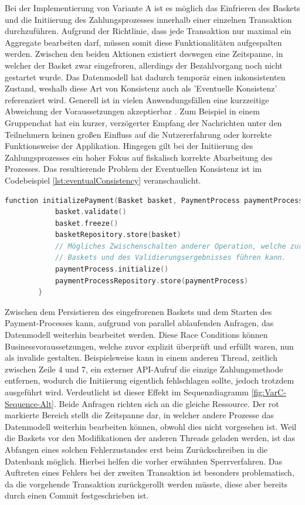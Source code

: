 Bei der Implementierung von Variante A ist es möglich das Einfrieren des Baskets und die Initiierung des Zahlungsprozesses innerhalb einer einzelnen Transaktion durchzuführen. Aufgrund der Richtlinie, dass jede Transaktion nur maximal ein Aggregate bearbeiten darf, müssen somit diese Funktionalitäten aufgespalten werden. Zwischen den beiden Aktionen existiert deswegen eine Zeitspanne, in welcher der Basket zwar eingefroren, allerdings der Bezahlvorgang noch nicht gestartet wurde. Das Datenmodell hat dadurch temporär einen inkonsistenten Zustand, weshalb diese Art von Konsistenz auch als 'Eventuelle Konsistenz' referenziert wird. Generell ist in vielen Anwendungsfällen eine kurzzeitige Abweichung der Voraussetzungen akzeptierbar \cite[S. 364f.]{Vernon.2011}. Zum Beispiel in einem Gruppenchat hat ein kurzer, verzögerter Empfang der Nachrichten unter den Teilnehmern keinen großen Einfluss auf die Nutzererfahrung oder korrekte Funktionsweise der Applikation. Hingegen gilt bei der Initiierung des Zahlungsprozesses ein hoher Fokus auf fiskalisch korrekte Abarbeitung des Prozesses. Das resultierende Problem der Eventuellen Konsistenz ist im Codebeispiel \ref{lst:eventualConsistency} veranschaulicht.

\begin{minipage}{\linewidth} %
	\begin{lstlisting}[caption={Getrennte Transaktionen für die Initiierung des Bezahlvorgangs}, label={lst:eventualConsistency}, language=Kotlin]
		function initializePayment(Basket basket, PaymentProcess paymentProcess) {
			basket.validate()
			basket.freeze()
			basketRepository.store(basket)
			// Mögliches Zwischenschalten anderer Operation, welche zur Abänderung des
			// Baskets und des Validierungsergebnisses führen kann.
			paymentProcess.initialize()
			paymentProcessRepository.store(paymentProcess)
		}
	\end{lstlisting}
\end{minipage}

Zwischen dem Persistieren des eingefrorenen Baskets und dem Starten des Payment-Processes kann, aufgrund von parallel ablaufenden Anfragen, das Datenmodell weiterhin bearbeitet werden. Diese \Gls{Race Condition}s können Businessvoraussetzungen, welche zuvor explizit überprüft und erfüllt waren, nun als invalide gestalten. Beispielsweise kann in einem anderen Thread, zeitlich zwischen Zeile 4 und 7, ein externer API-Aufruf die einzige Zahlungsmethode entfernen, wodurch die Initiierung eigentlich fehlschlagen sollte, jedoch trotzdem ausgeführt wird. Verdeutlicht ist dieser Effekt im Sequenzdiagramm \ref{fig:VarC-Sequence-Alt}. Beide Anfragen richten sich an die gleiche Ressource. Der rot markierte Bereich stellt die Zeitspanne dar, in welcher andere Prozesse das Datenmodell weiterhin bearbeiten können, obwohl dies nicht vorgesehen ist. Weil die Baskets vor den Modifikationen der anderen Threads geladen werden, ist das Abfangen eines solchen Fehlerzustandes erst beim Zurückschreiben in die Datenbank möglich. Hierbei helfen die vorher erwähnten Sperrverfahren. Das Auftreten eines Fehlers bei der zweiten Transaktion ist besonders problematisch, da die vorgehende Transaktion zurückgerollt werden müsste, diese aber bereits durch einen Commit festgeschrieben ist. 


